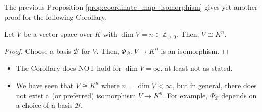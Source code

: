 \begin{remark}
The previous Proposition \ref{prop:coordinate_map_isomorphism} gives yet another proof for the following Corollary.
\end{remark}

\begin{corollary}
\label{cor:vs_isomorphic_to_kn}
Let $V$ be a vector space over $K$ with $\dim V = n \in \mathbb{Z}_{\ge 0}$. Then, $V \cong K^n$.
\end{corollary}

\begin{proof}
Choose a basis $\mathcal{B}$ for $V$. Then, $\Phi_{\mathcal{B}}: V \to K^n$ is an isomorphism.
\end{proof}

\begin{remark}
\begin{itemize}
    \item The Corollary does NOT hold for $\dim V = \infty$, at least not as stated.
    \item We have seen that $V \cong K^n$ where $n = \dim V < \infty$, but in general, there does not exist a  (or preferred) isomorphism $V \to K^n$. For example, $\Phi_{\mathcal{B}}$ depends on a choice of a basis $\mathcal{B}$.
\end{itemize}
\end{remark}

